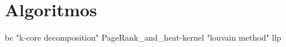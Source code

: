 \chapter{Algoritmos}
\label{chapter:alg}
{bc}
{"k-core decomposition"}
{PageRank_and_heat-kernel}
{"louvain method"}
{llp}
